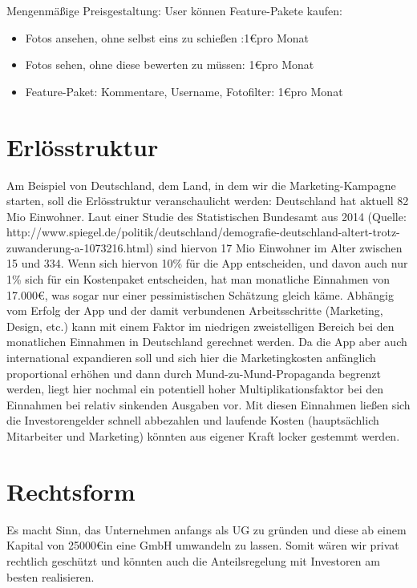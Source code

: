 Mengenmäßige Preisgestaltung: User können Feature-Pakete kaufen:
\begin{itemize}
\item Fotos ansehen, ohne selbst eins zu schießen :1\euro pro Monat
\item Fotos sehen, ohne diese bewerten zu müssen: 1\euro pro Monat
\item Feature-Paket: Kommentare, Username, Fotofilter: 1\euro pro Monat
\end{itemize}


\section{Erlösstruktur}
Am Beispiel von Deutschland, dem Land, in dem wir die Marketing-Kampagne starten, soll die Erlösstruktur veranschaulicht werden:
Deutschland hat aktuell 82 Mio Einwohner. Laut einer Studie des Statistischen Bundesamt aus 2014 (Quelle: http://www.spiegel.de/politik/deutschland/demografie-deutschland-altert-trotz-zuwanderung-a-1073216.html) sind hiervon 17 Mio Einwohner im Alter zwischen 15 und 334. Wenn sich hiervon 10\% für die App entscheiden, und davon auch nur 1\% sich für ein Kostenpaket entscheiden, hat man monatliche Einnahmen von 17.000\euro, was sogar nur einer pessimistischen Schätzung gleich käme. Abhängig vom Erfolg der App und der damit verbundenen Arbeitsschritte (Marketing, Design, etc.) kann mit einem Faktor im niedrigen zweistelligen Bereich bei den monatlichen Einnahmen in Deutschland gerechnet werden. Da die App aber auch international expandieren soll und sich hier die Marketingkosten anfänglich proportional erhöhen und dann durch  Mund-zu-Mund-Propaganda begrenzt werden, liegt hier nochmal ein potentiell hoher Multiplikationsfaktor bei den Einnahmen bei relativ sinkenden Ausgaben vor. Mit diesen Einnahmen ließen sich die Investorengelder schnell abbezahlen und laufende Kosten (hauptsächlich Mitarbeiter und Marketing) könnten aus eigener Kraft locker gestemmt werden.


\section{Rechtsform}
Es macht Sinn, das Unternehmen anfangs als UG zu gründen und diese ab einem Kapital von 25000\euro in eine GmbH umwandeln zu lassen. Somit wären wir privat rechtlich geschützt und könnten auch die Anteilsregelung mit Investoren am besten realisieren.

